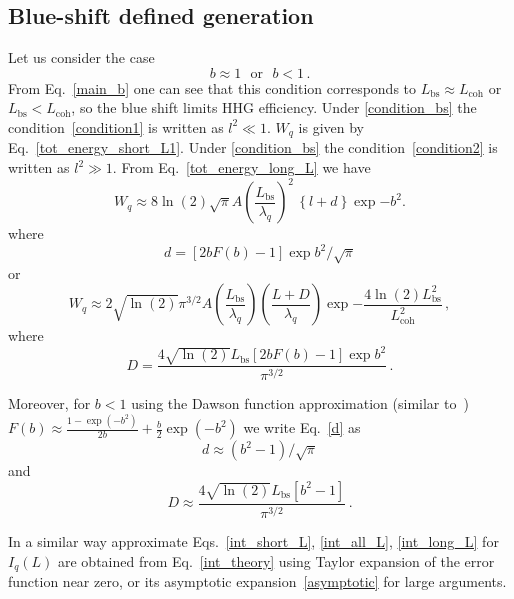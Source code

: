 \subsection{Blue-shift defined generation}
%
Let us consider the case 
\begin{equation}
      b \approx 1 \: \: \: \mathrm{or} \: \: \: b<1 \, .
\label {condition_bs}
\end{equation}
From Eq.~\eqref{main_b} one can see that this condition corresponds to $L_\mathrm{bs} \approx  L_\mathrm{coh}$ or $L_\mathrm{bs} <  L_\mathrm{coh}$, so the blue shift limits HHG efficiency. Under \eqref{condition_bs} the condition~\eqref{condition1} is written as $l^2 \ll 1$. $W_q$ is given by Eq.~\eqref{tot_energy_short_L1}. Under \eqref{condition_bs} the condition~\eqref{condition2} is written as $l^2 \gg 1$. From Eq.~\eqref{tot_energy_long_L} we have
\begin{equation}
W_q \approx 8 \ln(2) \sqrt{\pi} A\left( \frac{L_\mathrm{bs}}{\lambda_q}\right)^2 \, 
\left\{  l +d \right\}\exp{-b^2}. 
\label{tot_energy_long_L4}
\end{equation}
where
\begin{equation}
d=[2 b F(b)-1] \exp{b^2} / \sqrt{\pi}
\label{d}
\end{equation}
or
\begin{equation}
W_q \approx  2 \sqrt{\ln(2)} \pi^{3/2} A\left( \frac{L_\mathrm{bs}}{\lambda_q}\right) \left( \frac{L+D}{\lambda_q}\right) 
\exp{-\frac{4 \ln(2) L_\mathrm{bs}^2}{L_\mathrm{coh}^2}}
\, ,
\label{tot_energy_long_L5}
\end{equation}
where
\begin{equation}
D=\frac{4 \sqrt{\ln(2)} L_\mathrm{bs} [2 b F(b)-1] \exp{b^2}}{\pi^{3/2}} \, .
\label{D}
\end{equation}

Moreover, for $b < 1 $ using the Dawson function approximation (similar to~\cite{Dawson_approximation}) $F(b) \approx \frac{1-\exp(-b^2)}{2b}+\frac{b}{2}\exp(-b^2)$ we write Eq.~\eqref{d} as
\begin{equation}
d \approx  (b^2-1)/ \sqrt{\pi}
\label{d1}
\end{equation}
and
\begin{equation}
D \approx  \frac{4 \sqrt{\ln(2)} L_\mathrm{bs} [b^2-1]} {\pi^{3/2}} \, .
\label{D1}
\end{equation}

In a similar way approximate Eqs.~\eqref{int_short_L}, \eqref{int_all_L}, \eqref{int_long_L} for $I_q(L)$ are obtained from Eq.~\eqref{int_theory} using Taylor expansion of the error function near zero, or its asymptotic expansion~\eqref{asymptotic} for large arguments.  
